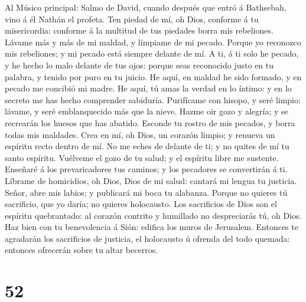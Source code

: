  Al Músico principal: Salmo de David, cuando después que
entró á Bathsebah, vino á él Nathán el profeta. Ten piedad de mí, oh
Dios, conforme á tu misericordia: conforme á la multitud de tus piedades
borra mis rebeliones.  Lávame más y más de mi maldad, y
límpiame de mi pecado.  Porque yo reconozco mis
rebeliones; y mi pecado está siempre delante de mí.  A ti,
á ti solo he pecado, y he hecho lo malo delante de tus ojos: porque seas
reconocido justo en tu palabra, y tenido por puro en tu juicio.
 He aquí, en maldad he sido formado, y en pecado me
concibió mi madre.  He aquí, tú amas la verdad en lo
íntimo: y en lo secreto me has hecho comprender sabiduría.
 Purifícame con hisopo, y seré limpio: lávame, y seré
emblanquecido más que la nieve.  Hazme oir gozo y alegría;
y se recrearán los huesos que has abatido.  Esconde tu
rostro de mis pecados, y borra todas mis maldades.  Crea
en mí, oh Dios, un corazón limpio; y renueva un espíritu recto dentro de
mí.  No me eches de delante de ti; y no quites de mí tu
santo espíritu.  Vuélveme el gozo de tu salud; y el
espíritu libre me sustente.  Enseñaré á los
prevaricadores tus caminos; y los pecadores se convertirán á ti.
 Líbrame de homicidios, oh Dios, Dios de mi salud:
cantará mi lengua tu justicia.  Señor, abre mis labios; y
publicará mi boca tu alabanza.  Porque no quieres tú
sacrificio, que yo daría; no quieres holocausto.  Los
sacrificios de Dios son el espíritu quebrantado: al corazón contrito y
humillado no despreciarás tú, oh Dios.  Haz bien con tu
benevolencia á Sión: edifica los muros de Jerusalem. 
Entonces te agradarán los sacrificios de justicia, el holocausto ú
ofrenda del todo quemada: entonces ofrecerán sobre tu altar becerros.

\hypertarget{section-51}{%
\section{52}\label{section-51}}

